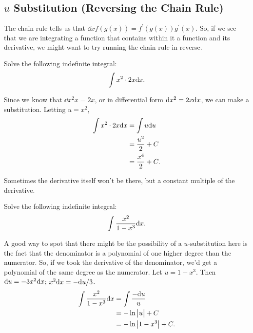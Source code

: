 \subsection{$u$ Substitution (Reversing the Chain Rule)}
The chain rule tells us that $\dd{}{x}f(g(x)) = f^\prime(g(x))g^\prime(x)$.
So, if we see that we are integrating a function that contains within it a function and its derivative, we might want to try running the chain rule in reverse.
\begin{example}
	Solve the following indefinite integral:
	\begin{equation*}
		\int{x^2\cdot 2x\mathrm{d} x}.
	\end{equation*}
\end{example}
\begin{answer}
	Since we know that $\dd{x^2}{x} = 2x$, or in differential form $\mathrm{d} x^2 = 2x\mathrm{d} x$, we can make a substitution.
	Letting $u = x^2$,
	\begin{align*}
		\int{x^2\cdot 2x\mathrm{d} x} &= \int{u\mathrm{d} u} \\
		&= \frac{u^2}{2} + C \\
		&= \frac{x^4}{2} + C.
	\end{align*}
\end{answer}


Sometimes the derivative itself won't be there, but a constant multiple of the derivative.
\begin{example}
	Solve the following indefinite integral:
	\begin{equation*}
		\int{\frac{x^2}{1-x^3}\mathrm{d} x}.
	\end{equation*}
\end{example}
\begin{answer}
	A good way to spot that there might be the possibility of a $u$-substitution here is the fact that the denominator is a polynomial of one higher degree than the numerator.
	So, if we took the derivative of the denominator, we'd get a polynomial of the same degree as the numerator.
	Let $u = 1-x^3$.
	Then $\mathrm{d} u = -3x^2\mathrm{d} x$; $x^2\mathrm{d} x = -\mathrm{d} u/3$.
	\begin{align*}
		\int{\frac{x^2}{1-x^3}\mathrm{d} x} &= \int{\frac{-\mathrm{d} u}{u}} \\
		&= -\ln{\big\lvert u \big\rvert} + C \\
		&= -\ln{\big\lvert 1-x^3 \big\rvert} + C.
	\end{align*}
\end{answer}


